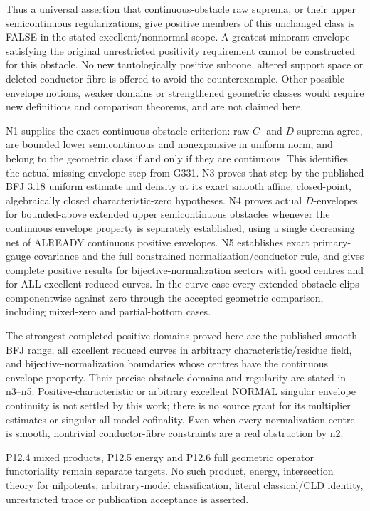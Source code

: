 \documentclass[11pt]{article}
\begin{document}
Thus a universal assertion that continuous-obstacle raw suprema, or their upper semicontinuous regularizations, give positive members of this unchanged class is FALSE in the stated excellent/nonnormal scope. A greatest-minorant envelope satisfying the original unrestricted positivity requirement cannot be constructed for this obstacle. No new tautologically positive subcone, altered support space or deleted conductor fibre is offered to avoid the counterexample. Other possible envelope notions, weaker domains or strengthened geometric classes would require new definitions and comparison theorems, and are not claimed here.

N1 supplies the exact continuous-obstacle criterion: raw \(C\)- and \(D\)-suprema agree, are bounded lower semicontinuous and nonexpansive in uniform norm, and belong to the geometric class if and only if they are continuous. This identifies the actual missing envelope step from G331. N3 proves that step by the published BFJ 3.18 uniform estimate and density at its exact smooth affine, closed-point, algebraically closed characteristic-zero hypotheses. N4 proves actual \(D\)-envelopes for bounded-above extended upper semicontinuous obstacles whenever the continuous envelope property is separately established, using a single decreasing net of ALREADY continuous positive envelopes. N5 establishes exact primary-gauge covariance and the full constrained normalization/conductor rule, and gives complete positive results for bijective-normalization sectors with good centres and for ALL excellent reduced curves. In the curve case every extended obstacle clips componentwise against zero through the accepted geometric comparison, including mixed-zero and partial-bottom cases.

The strongest completed positive domains proved here are the published smooth BFJ range, all excellent reduced curves in arbitrary characteristic/residue field, and bijective-normalization boundaries whose centres have the continuous envelope property. Their precise obstacle domains and regularity are stated in n3--n5. Positive-characteristic or arbitrary excellent NORMAL singular envelope continuity is not settled by this work; there is no source grant for its multiplier estimates or singular all-model cofinality. Even when every normalization centre is smooth, nontrivial conductor-fibre constraints are a real obstruction by n2.

P12.4 mixed products, P12.5 energy and P12.6 full geometric operator functoriality remain separate targets. No such product, energy, intersection theory for nilpotents, arbitrary-model classification, literal classical/CLD identity, unrestricted trace or publication acceptance is asserted.
\end{document}
